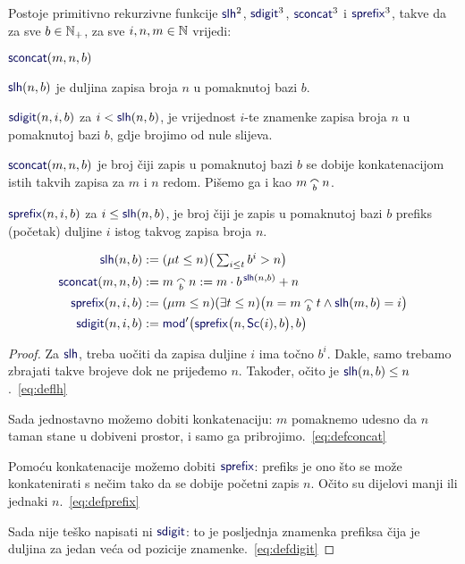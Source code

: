 \begin{lema}[{name=[rad sa zapisima u pomaknutoj bazi]}]\label{lm:ldcpprn}
Postoje primitivno rekurzivne funkcije $\f{slh}^2$\!, $\f{sdigit}^3$\!, $\f{sconcat}^3$ i $\f{sprefix}^3$, takve da za sve $b\in{\mathbb N}_+$, za sve $i,n,m\in{\mathbb N}$ vrijedi:
\begin{labeling}{$\f{sconcat}(m,n,b)$}
    \item[$\f{slh}(n,b)$] je duljina zapisa broja $n$ u pomaknutoj bazi $b$. \item[$\f{sdigit}(n,i,b)$] za $i<\f{slh}(n,b)$, je vrijednost $i$-te znamenke zapisa broja $n$ u pomaknutoj bazi $b$, gdje brojimo od nule slijeva.
    \item[$\f{sconcat}(m,n,b)$] je broj čiji zapis u pomaknutoj bazi $b$ se dobije konkatenacijom istih takvih zapisa za $m$ i $n$ redom. Pišemo ga i kao $m\conc bn$.
    \item[$\f{sprefix}(n,i,b)$] za $i\le\f{slh}(n,b)$, je broj čiji je zapis u pomaknutoj bazi $b$ prefiks (početak) duljine $i$ istog takvog zapisa broja $n$.
\end{labeling}
\end{lema}
\noindent\begin{align}
\label{eq:deflh}
    \f{slh}(n,b)&:=(\mu t\le n)\big(
    \textstyle\sum_{i\le t}b^i>n
    \big)\\
\label{eq:defconcat}
    \f{sconcat}(m,n,b)&:=m\conc bn:=m\cdot b^{\,\f{slh}(n,b)}+n\\
\label{eq:defprefix}
    \f{sprefix}(n,i,b)&:=(\mu m\le n)(\exists t\le n)\bigl(n=m\conc bt\land\f{slh}(m,b)=i\bigr)\\
\label{eq:defdigit}
    \f{sdigit}(n,i,b)&:=\f{mod}'\bigl(\f{sprefix}\bigl(n,\f{Sc}(i),b\bigr),b\bigr)
\end{align}
\begin{proof}
Za $\f{slh}$, treba uočiti da zapisa duljine $i$ ima točno $b^i$. Dakle, samo trebamo zbrajati takve brojeve dok ne prijeđemo $n$. Također, očito je $\f{slh}(n,b)\le n$.~\eqref{eq:deflh}

Sada jednostavno možemo dobiti konkatenaciju: $m$ pomaknemo udesno da $n$ taman stane u dobiveni prostor, i samo ga pribrojimo.~\eqref{eq:defconcat}

Pomoću konkatenacije možemo dobiti $\f{sprefix}$: prefiks je ono što se može konkatenirati s nečim tako da se dobije početni zapis $n$. Očito su dijelovi manji ili jednaki $n$.~\eqref{eq:defprefix}

Sada nije teško napisati ni $\f{sdigit}$: to je posljednja znamenka prefiksa čija je duljina za jedan veća od pozicije znamenke.~\eqref{eq:defdigit}
\end{proof}

